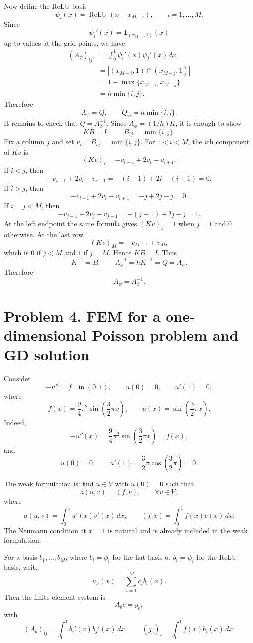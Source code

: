 \documentclass[11pt]{article}
\newcommand{\relu}{\operatorname{ReLU}}
\begin{document}
Now define the ReLU basis
\[
  \psi_i(x)=\relu(x-x_{M-i}),\qquad i=1,\dots,M.
\]
Since
\[
  \psi_i'(x)=\mathbf 1_{(x_{M-i},1)}(x)
\]
up to values at the grid points, we have
\[
\begin{aligned}
  (A_\psi)_{ij}
  &=\int_0^1 \psi_i'(x)\psi_j'(x)\,dx \\
  &=\left| (x_{M-i},1)\cap (x_{M-j},1)\right| \\
  &=1-\max\{x_{M-i},x_{M-j}\} \\
  &=h\min\{i,j\}.
\end{aligned}
\]
Therefore
\[
  A_\psi=Q,
  \qquad
  Q_{ij}=h\min\{i,j\}.
\]
It remains to check that $Q=A_\phi^{-1}$. Since $A_\phi=(1/h)K$, it is enough to show
\[
  K B=I,
  \qquad B_{ij}=\min\{i,j\}.
\]
Fix a column $j$ and set $v_i=B_{ij}=\min\{i,j\}$. For $1<i<M$, the $i$th component of $Kv$ is
\[
  (Kv)_i=-v_{i-1}+2v_i-v_{i+1}.
\]
If $i<j$, then
\[
  -v_{i-1}+2v_i-v_{i+1}=-(i-1)+2i-(i+1)=0.
\]
If $i>j$, then
\[
  -v_{i-1}+2v_i-v_{i+1}=-j+2j-j=0.
\]
If $i=j<M$, then
\[
  -v_{j-1}+2v_j-v_{j+1}=-(j-1)+2j-j=1.
\]
At the left endpoint the same formula gives $(Kv)_1=1$ when $j=1$ and $0$ otherwise. At the last row,
\[
  (Kv)_M=-v_{M-1}+v_M,
\]
which is $0$ if $j<M$ and $1$ if $j=M$. Hence $KB=I$. Thus
\[
  K^{-1}=B,
  \qquad
  A_\phi^{-1}=hK^{-1}=Q=A_\psi.
\]
Therefore
\[
  \boxed{A_\psi=A_\phi^{-1}.}
\]

\section*{Problem 4. FEM for a one-dimensional Poisson problem and GD solution}

Consider
\[
  -u''=f\quad\text{in }(0,1),
  \qquad
  u(0)=0,
  \qquad
  u'(1)=0,
\]
where
\[
  f(x)=\frac94\pi^2\sin\left(\frac32\pi x\right),
  \qquad
  u(x)=\sin\left(\frac32\pi x\right).
\]
Indeed,
\[
  -u''(x)=\frac94\pi^2\sin\left(\frac32\pi x\right)=f(x),
\]
and
\[
  u(0)=0,
  \qquad
  u'(1)=\frac32\pi\cos\left(\frac32\pi\right)=0.
\]

The weak formulation is: find $u\in V$ with $u(0)=0$ such that
\[
  a(u,v)=(f,v),\qquad \forall v\in V,
\]
where
\[
  a(u,v)=\int_0^1 u'(x)v'(x)\,dx,
  \qquad
  (f,v)=\int_0^1 f(x)v(x)\,dx.
\]
The Neumann condition at $x=1$ is natural and is already included in the weak formulation.

For a basis $b_1,\dots,b_M$, where $b_i=\phi_i$ for the hat basis or $b_i=\psi_i$ for the ReLU basis, write
\[
  u_h(x)=\sum_{i=1}^M c_i b_i(x).
\]
Then the finite element system is
\[
  A_b c=g_b,
\]
with
\[
  (A_b)_{ij}=\int_0^1 b_i'(x)b_j'(x)\,dx,
  \qquad
  (g_b)_i=\int_0^1 f(x)b_i(x)\,dx.
\]
\end{document}
